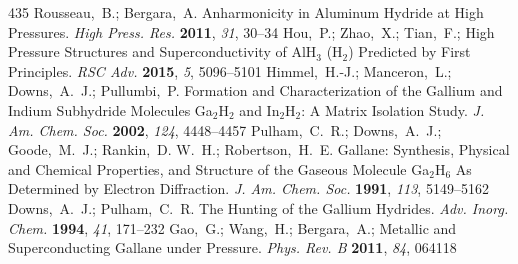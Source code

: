\documentclass[12pt,letterpaper,oneside]{article}
\begin{document}
\begin{mcitethebibliography}{435}
\mciteSetBstMidEndSepPunct{\mcitedefaultmidpunct}
{\mcitedefaultendpunct}{\mcitedefaultseppunct}\relax
\EndOfBibitem
{}
Rousseau,~B.; Bergara,~A. Anharmonicity in Aluminum Hydride at High Pressures.
  \emph{High Press. Res.} \textbf{2011}, \emph{31}, 30--34\relax
\mciteBstWouldAddEndPuncttrue
\mciteSetBstMidEndSepPunct{\mcitedefaultmidpunct}
{\mcitedefaultendpunct}{\mcitedefaultseppunct}\relax
\EndOfBibitem
{}
Hou,~P.; Zhao,~X.; Tian,~F.;   High Pressure
  Structures and Superconductivity of AlH$_3$ (H$_2$) Predicted by First
  Principles. \emph{RSC Adv.} \textbf{2015}, \emph{5}, 5096--5101\relax
\mciteBstWouldAddEndPuncttrue
\mciteSetBstMidEndSepPunct{\mcitedefaultmidpunct}
{\mcitedefaultendpunct}{\mcitedefaultseppunct}\relax
\EndOfBibitem
{}
Himmel,~H.-J.; Manceron,~L.; Downs,~A.~J.; Pullumbi,~P. Formation and
  Characterization of the Gallium and Indium Subhydride Molecules Ga$_2$H$_2$
  and In$_2$H$_2$: A Matrix Isolation Study. \emph{J. Am. Chem. Soc.}
  \textbf{2002}, \emph{124}, 4448--4457\relax
\mciteBstWouldAddEndPuncttrue
\mciteSetBstMidEndSepPunct{\mcitedefaultmidpunct}
{\mcitedefaultendpunct}{\mcitedefaultseppunct}\relax
\EndOfBibitem
{}
Pulham,~C.~R.; Downs,~A.~J.; Goode,~M.~J.; Rankin,~D. W.~H.; Robertson,~H.~E.
  Gallane: Synthesis, Physical and Chemical Properties, and Structure of the
  Gaseous Molecule Ga$_{2}$H$_{6}$ As Determined by Electron Diffraction.
  \emph{J. Am. Chem. Soc.} \textbf{1991}, \emph{113}, 5149--5162\relax
\mciteBstWouldAddEndPuncttrue
\mciteSetBstMidEndSepPunct{\mcitedefaultmidpunct}
{\mcitedefaultendpunct}{\mcitedefaultseppunct}\relax
\EndOfBibitem
{}
Downs,~A.~J.; Pulham,~C.~R. The Hunting of the Gallium Hydrides. \emph{Adv.
  Inorg. Chem.} \textbf{1994}, \emph{41}, 171--232\relax
\mciteBstWouldAddEndPuncttrue
\mciteSetBstMidEndSepPunct{\mcitedefaultmidpunct}
{\mcitedefaultendpunct}{\mcitedefaultseppunct}\relax
\EndOfBibitem
{}
Gao,~G.; Wang,~H.; Bergara,~A.;   Metallic and
  Superconducting Gallane under Pressure. \emph{Phys. Rev. B} \textbf{2011},
  \emph{84}, 064118\relax
\mciteBstWouldAddEndPuncttrue

\end{mcitethebibliography}
\end{document}
